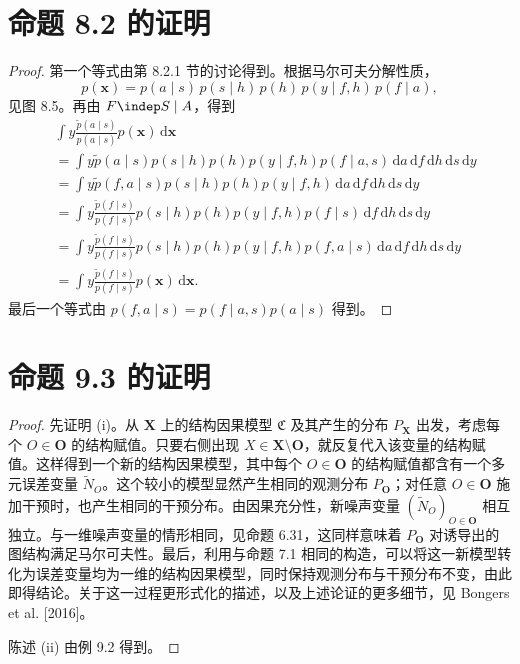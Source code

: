 \section{命题 8.2 的证明}
\begin{proof}
第一个等式由第 8.2.1 节的讨论得到。根据马尔可夫分解性质，
\[p(\mathbf x)=p(a\mid s)\,p(s\mid h)\,p(h)\,p(y\mid f,h)\,p(f\mid a),\]
见图 8.5。再由 $F\indep S\mid A$，得到
\[\begin{aligned}
&\int y\frac{\widetilde p(a\mid s)}{p(a\mid s)}p(\mathbf x)\,\mathrm d\mathbf x\\
&=\int y\widetilde p(a\mid s)p(s\mid h)p(h)p(y\mid f,h)p(f\mid a,s)
\,\mathrm da\,\mathrm df\,\mathrm dh\,\mathrm ds\,\mathrm dy\\
&=\int y\widetilde p(f,a\mid s)p(s\mid h)p(h)p(y\mid f,h)
\,\mathrm da\,\mathrm df\,\mathrm dh\,\mathrm ds\,\mathrm dy\\
&=\int y\frac{\widetilde p(f\mid s)}{p(f\mid s)}p(s\mid h)p(h)p(y\mid f,h)p(f\mid s)
\,\mathrm df\,\mathrm dh\,\mathrm ds\,\mathrm dy\\
&=\int y\frac{\widetilde p(f\mid s)}{p(f\mid s)}p(s\mid h)p(h)p(y\mid f,h)p(f,a\mid s)
\,\mathrm da\,\mathrm df\,\mathrm dh\,\mathrm ds\,\mathrm dy\\
&=\int y\frac{\widetilde p(f\mid s)}{p(f\mid s)}p(\mathbf x)\,\mathrm d\mathbf x.
\end{aligned}\]
最后一个等式由 $p(f,a\mid s)=p(f\mid a,s)p(a\mid s)$ 得到。
\end{proof}

\section{命题 9.3 的证明}
\begin{proof}
先证明 (i)。从 $\mathbf X$ 上的结构因果模型 $\mathfrak C$ 及其产生的分布 $P_{\mathbf X}$ 出发，考虑每个 $O\in\mathbf O$ 的结构赋值。只要右侧出现 $X\in\mathbf X\setminus\mathbf O$，就反复代入该变量的结构赋值。这样得到一个新的结构因果模型，其中每个 $O\in\mathbf O$ 的结构赋值都含有一个多元误差变量 $\widetilde N_O$。这个较小的模型显然产生相同的观测分布 $P_{\mathbf O}$；对任意 $O\in\mathbf O$ 施加干预时，也产生相同的干预分布。由因果充分性，新噪声变量 $(\widetilde N_O)_{O\in\mathbf O}$ 相互独立。与一维噪声变量的情形相同，见命题 6.31，这同样意味着 $P_{\mathbf O}$ 对诱导出的图结构满足马尔可夫性。最后，利用与命题 7.1 相同的构造，可以将这一新模型转化为误差变量均为一维的结构因果模型，同时保持观测分布与干预分布不变，由此即得结论。关于这一过程更形式化的描述，以及上述论证的更多细节，见 Bongers et al. [2016]。

陈述 (ii) 由例 9.2 得到。
\end{proof}

